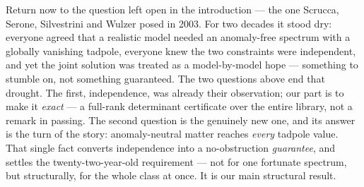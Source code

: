 \documentclass[11pt,a4paper]{article}
\begin{document}
Return now to the question left open in the introduction --- the one Scrucca, Serone,
Silvestrini and Wulzer posed in 2003. For two decades it stood dry: everyone agreed that a
realistic model needed an anomaly-free spectrum with a globally vanishing tadpole, everyone
knew the two constraints were independent, and yet the joint solution was treated as a
model-by-model hope --- something to stumble on, not something guaranteed. The two
questions above end that drought. The first, independence, was already their observation;
our part is to make it \emph{exact} --- a full-rank determinant certificate over the entire
library, not a remark in passing. The second question is the genuinely new one, and its
answer is the turn of the story: anomaly-neutral matter reaches \emph{every} tadpole value.
That single fact converts independence into a no-obstruction \emph{guarantee}, and settles
the twenty-two-year-old requirement --- not for one fortunate spectrum, but structurally,
for the whole class at once. It is our main structural result.
\end{document}
